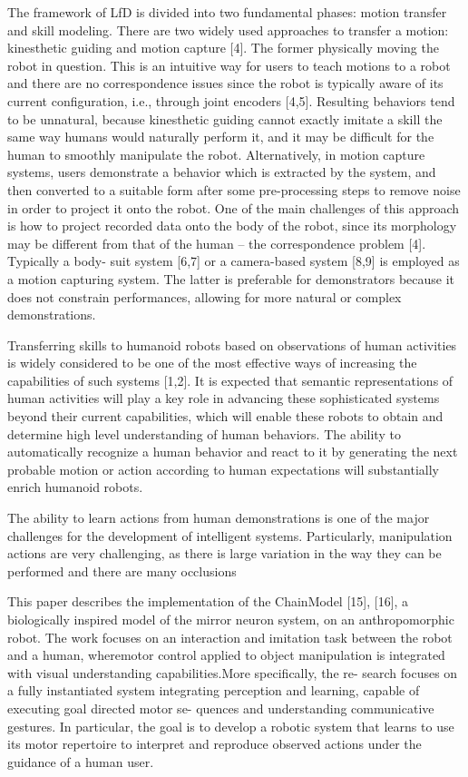 {The framework of LfD is divided into two fundamental phases: motion transfer and skill modeling. There are two widely used approaches to transfer a motion: kinesthetic guiding and motion capture [4]. The former physically moving the robot in question. This is an intuitive way for users to teach motions to a robot and there are no correspondence issues since the robot is typically aware of its current configuration, i.e., through joint encoders [4,5]. Resulting behaviors tend to be unnatural, because kinesthetic guiding cannot exactly imitate a skill the same way humans would naturally perform it, and it may be difficult for the human to smoothly manipulate the robot. Alternatively, in motion capture systems, users demonstrate a behavior which is extracted by the system, and then converted to a suitable form after some pre-processing steps to remove noise in order to project it onto the robot. One of the main challenges of this approach is how to project recorded data onto the body of the robot, since its morphology may be different from that of the human – the correspondence problem [4]. Typically a body- suit system [6,7] or a camera-based system [8,9] is employed as a motion capturing system. The latter is preferable for demonstrators because it does not constrain performances, allowing for more natural or complex demonstrations.


Transferring skills to humanoid robots based on observations of human activities is widely considered to be one of the most effective ways of increasing the capabilities of such systems [1,2]. It is expected that semantic representations of human activities will play a key role in advancing these sophisticated systems beyond their current capabilities, which will enable these robots to obtain and determine high level understanding of human behaviors. The ability to automatically recognize a human behavior and react to it by generating the next probable motion or action according to human expectations will substantially enrich humanoid robots.

The ability to learn actions from human demonstrations is one of the major challenges for the development of intelligent systems. Particularly, manipulation actions are very challenging, as there is large variation in the way they can be performed and there are many occlusions



This paper describes the implementation of the ChainModel [15], [16], a biologically inspired model of the mirror neuron system, on an anthropomorphic robot. The work focuses on an interaction and imitation task between the robot and a human, wheremotor control applied to object manipulation is integrated with visual understanding capabilities.More specifically, the re- search focuses on a fully instantiated system integrating perception and learning, capable of executing goal directed motor se- quences and understanding communicative gestures. In particular, the goal is to develop a robotic system that learns to use its motor repertoire to interpret and reproduce observed actions under the guidance of a human user.





}
